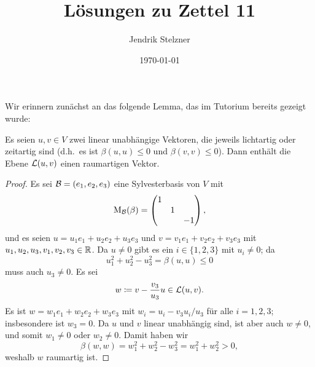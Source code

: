 \documentclass[a4paper,10pt,numbers=noenddot]{scrartcl}
\title{Lösungen zu Zettel 11}
\author{Jendrik Stelzner}
\date{\today}
\begin{document}
\maketitle


Wir erinnern zunächst an das folgende Lemma, das im Tutorium bereits gezeigt wurde:


\begin{lemma}\label{lem: existence of spacelike vectors}
  Es seien $u, v \in V$ zwei linear unabhängige Vektoren, die jeweils lichtartig oder zeitartig sind (d.h.\ es ist $\beta(u,u) \leq 0$ und $\beta(v,v) \leq 0$).
  Dann enthält die Ebene $\operatorname{\mathcal{L}}(u,v)$ einen raumartigen Vektor.
\end{lemma}
\begin{proof}
  Es sei $\mathcal{B} = (e_1, e_2, e_3)$ eine Sylvesterbasis von $V$ mit
  \[
    \operatorname{M}_{\mathcal{B}}(\beta)
    =
    \begin{pmatrix}
      1 &   &     \\
        & 1 &     \\
        &   & -1
    \end{pmatrix},
  \]
  und es seien $u = u_1 e_1 + u_2 e_2 + u_3 e_3$ und $v = v_1 e_1 + v_2 e_2 + v_3 e_3$ mit $u_1, u_2, u_3, v_1, v_2, v_3 \in \mathbb{R}$.
  Da $u \neq 0$ gibt es ein $i \in \{1, 2, 3\}$ mit $u_i \neq 0$; da
  \[
      u_1^2 + u_2^2 - u_3^2
    = \beta(u,u)
    \leq 0
  \]
  muss auch $u_3 \neq 0$.
  Es sei 
  \[
              w
    \coloneqq v - \frac{v_3}{u_3} u
    \in       \operatorname{\mathcal{L}}(u, v).
  \]
  Es ist $w = w_1 e_1 + w_2 e_2 + w_3 e_3$ mit $w_i = u_i - v_3 u_i / u_3$ für alle $i = 1, 2, 3$; insbesondere ist $w_3 = 0$.
  Da $u$ und $v$ linear unabhängig sind, ist aber auch $w \neq 0$, und somit $w_1 \neq 0$ oder $w_2 \neq 0$.
  Damit haben wir
  \[
      \beta(w,w)
    = w_1^2 + w_2^2 - w_3^2
    = w_1^2 + w_2^2
    > 0,
  \]
  weshalb $w$ raumartig ist.
\end{proof}











\section{}





\subsection{}
\end{document}
